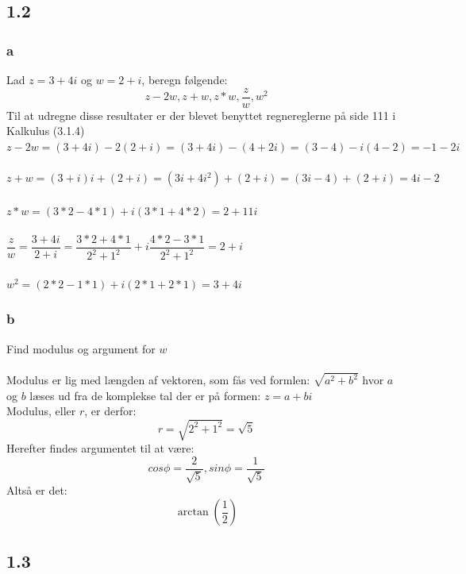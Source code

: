 \documentclass[12pt]{article}
\begin{document}
\subsection*{1.2}
\subsubsection*{a}
Lad $z=3+4i$ og $w=2+i$, beregn følgende:
$$z-2w, z+w, z * w, \dfrac{z}{w}, w^2$$
Til at udregne disse resultater er der blevet benyttet regnereglerne på side 111 i Kalkulus (3.1.4)\\
$z-2w= (3+4i)-2(2+i)=(3+4i)-(4+2i)=(3-4)-i(4-2)=-1-2i$\\ \\
$z+w=(3+i)i+(2+i)=(3i+4i^2)+(2+i)=(3i-4)+(2+i)=4i-2$\\ \\
$z * w=(3*2-4*1)+i(3*1+4*2)=2+11i$\\ \\
$\dfrac{z}{w}=\dfrac{3+4i}{2+i}=\dfrac{3*2+4*1}{2^2+1^2}+i\dfrac{4*2-3*1}{2^2+1^2}=2+i$\\ \\
$w^2=(2*2-1*1)+i(2*1+2*1)=3+4i$

\subsubsection*{b}
Find modulus og argument for $w$\\
\\
Modulus er lig med længden af vektoren, som fås ved formlen: $\sqrt{a^2+b^2}$ hvor $a$ og $b$ læses ud fra de komplekse tal der er på formen: $z=a+bi$\\
Modulus, eller $r$, er derfor:
$$r=\sqrt{2^2+1^2}=\sqrt{5}$$
Herefter findes argumentet til at være:
$$cos\phi=\dfrac{2}{\sqrt{5}}, sin\phi=\dfrac{1}{\sqrt{5}}$$
Altså er det:\\
$$ \arctan(\dfrac{1}{2})$$
\subsection*{1.3}
\end{document}

